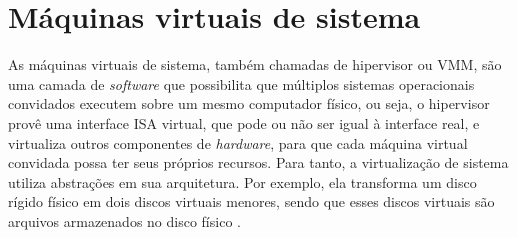 
\section{Máquinas virtuais de sistema}
\label{section:virtsistema}

As máquinas virtuais de sistema, também chamadas de hipervisor ou \ac{VMM}, são uma camada de \textit{software} que possibilita
que múltiplos sistemas operacionais convidados executem sobre um mesmo computador físico, ou seja, o hipervisor provê uma interface
\ac{ISA} virtual, que pode ou não ser igual à interface real, e virtualiza outros componentes de \textit{hardware}, para que cada máquina
virtual convidada possa ter seus próprios recursos. Para tanto, a virtualização de sistema utiliza abstrações em sua arquitetura. 
Por exemplo, ela transforma um disco rígido físico em dois discos virtuais menores, sendo que esses discos virtuais são arquivos armazenados no 
disco físico \cite{smithenair2005}.

